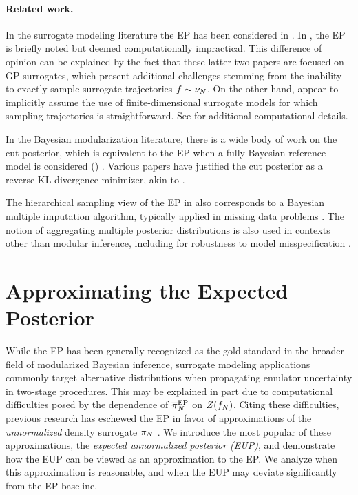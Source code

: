 \documentclass[12pt]{article}
\begin{document}
\paragraph{Related work.} In the surrogate modeling literature the EP has been considered 
in \citet{trainDynamics,BurknerSurrogate,garegnani2021NoisyMCMC}. In 
\citet{StuartTeck2,VehtariParallelGP}, the EP is briefly noted but deemed computationally impractical. 
This difference of opinion can be explained by the fact that these latter two papers are focused 
on GP surrogates, which present additional challenges stemming from the inability to exactly 
sample surrogate trajectories $f \sim \nu_{N}$. On the other hand, 
\citet{BurknerSurrogate,garegnani2021NoisyMCMC} appear to implicitly assume the use of 
finite-dimensional surrogate models for which sampling trajectories is straightforward.
See  for additional computational details.

In the Bayesian modularization literature, there is a wide body of work 
on the cut posterior, which is equivalent to the EP 
when a fully Bayesian reference model is considered ()
\citep{PlummerCut,cutInference,moduleModels}.
Various papers have justified the cut posterior as a reverse KL divergence minimizer, 
akin to  \citep{cutVar,cutVar2,moduleModels}. 

The hierarchical sampling view of the EP in  also 
corresponds to a Bayesian multiple imputation algorithm, typically applied
in missing data problems \citep{multipleImputationMedical,missingData}.
The notion of aggregating multiple posterior distributions is also used in 
contexts other than modular inference, including for robustness to model 
misspecification \citep{BayesBag,BayesBag2}.

\section{Approximating the Expected Posterior}
 While the EP has been generally recognized as the gold standard 
 in the broader field of modularized Bayesian inference, surrogate 
 modeling applications commonly target alternative distributions when 
 propagating emulator uncertainty in two-stage procedures. This may 
 be explained in part due to computational difficulties posed by 
 the dependence of $\overline{\pi}_{N}^{\mathrm{EP}}$ on $Z(f_{N})$.
Citing these difficulties, previous research has 
eschewed the EP in favor of approximations of the \textit{unnormalized}
density surrogate $\pi_{N}$ \citep{StuartTeck1,StuartTeck2,VehtariParallelGP}.
We introduce the most popular of these approximations, the 
\textit{expected unnormalized posterior (EUP)}, and demonstrate 
how the EUP can be viewed as an approximation to the EP. We analyze when 
this approximation is reasonable, and when the EUP may deviate significantly 
from the EP baseline.
\end{document}
